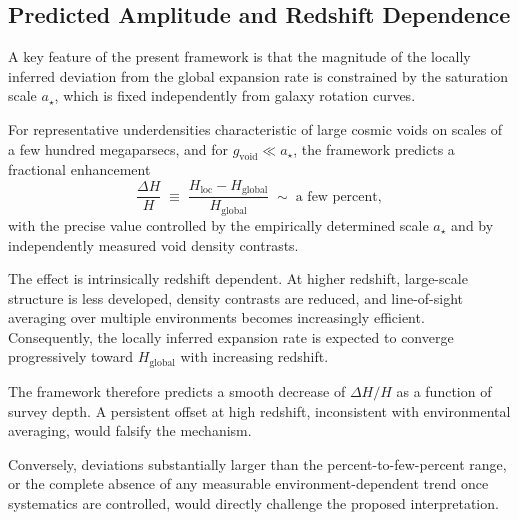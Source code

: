 \subsection{Predicted Amplitude and Redshift Dependence}
  \label{subsec:hubble_predictions}

  A key feature of the present framework is that the magnitude of the
  locally inferred deviation from the global expansion rate is
  constrained by the saturation scale $a_\star$, which is fixed
  independently from galaxy rotation curves.

  For representative underdensities characteristic of large
  cosmic voids on scales of a few hundred megaparsecs,
  and for $g_{\mathrm{void}} \ll a_\star$,
  the framework predicts a fractional enhancement
  \begin{equation}
    \frac{\Delta H}{H}
    \;\equiv\;
    \frac{H_{\mathrm{loc}} - H_{\mathrm{global}}}
    {H_{\mathrm{global}}}
    \;\sim\;
    \text{a few percent},
    \label{eq:deltaH}
  \end{equation}
  with the precise value controlled by the empirically
  determined scale $a_\star$ and by independently measured
  void density contrasts.

  The effect is intrinsically redshift dependent.
  At higher redshift, large-scale structure is less developed,
  density contrasts are reduced, and line-of-sight averaging
  over multiple environments becomes increasingly efficient.
  Consequently, the locally inferred expansion rate is expected
  to converge progressively toward $H_{\mathrm{global}}$
  with increasing redshift.

  The framework therefore predicts a smooth decrease of
  $\Delta H/H$ as a function of survey depth.
  A persistent offset at high redshift, inconsistent with
  environmental averaging, would falsify the mechanism.

  Conversely, deviations substantially larger than the
  percent-to-few-percent range, or the complete absence of any
  measurable environment-dependent trend once systematics are
  controlled, would directly challenge the proposed interpretation.
